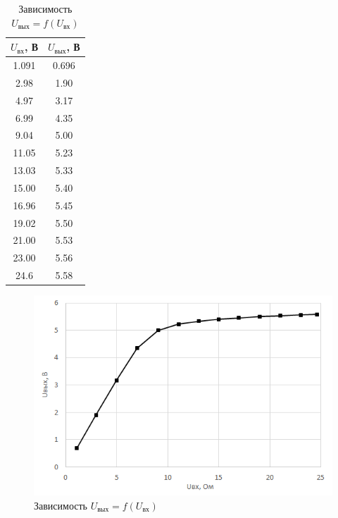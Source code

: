 \begin{table}[H]
	\begin{center}
	\caption{Зависимость $U_\text{вых} = f(U_\text{вх})$}
	\def\arraystretch{1.2}
		\begin{tabular}{|c|c|}
		\hline 
		$U_\text{вх}$, В & $U_\text{вых}$, В \\ 
		\hline 
		1.091 & 0.696 \\ 
		\hline 
		2.98 & 1.90 \\ 
		\hline 
		4.97 & 3.17 \\ 
		\hline 
		6.99 & 4.35 \\ 
		\hline %
		9.04 & 5.00 \\ 
		\hline 
		11.05 & 5.23 \\ 
		\hline 
		13.03 & 5.33 \\ 
		\hline 
		15.00 & 5.40 \\ 
		\hline 
		16.96 & 5.45 \\ 
		\hline 
		19.02 & 5.50 \\ 
		\hline 
		21.00 & 5.53 \\ 
		\hline 
		23.00 & 5.56 \\ 
		\hline 
		24.6 & 5.58 \\ 
		\hline 
		\end{tabular} 
		\label{tab:5:1}
	\end{center}
\end{table}

\begin{figure}[H]
	\begin{center}
		\includegraphics[width=14cm]{img/1}
		\caption{Зависимость $U_\text{вых} = f(U_\text{вх})$}
		\label{graphic:5:1} %
	\end{center}
\end{figure}

